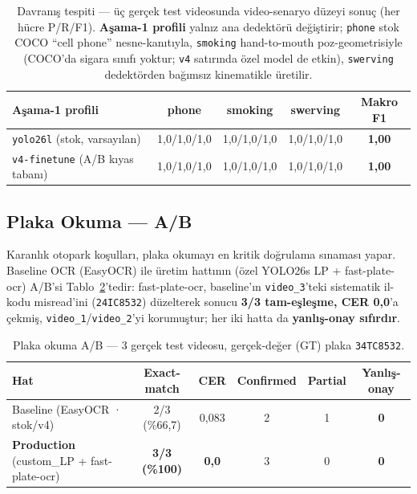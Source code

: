 \documentclass[12pt,a4paper]{article}
\newcommand{\tcode}[1]{\texttt{\small #1}}
\begin{document}
\begin{table}[H]\centering\small
\caption{Davranış tespiti — üç gerçek test videosunda video-senaryo düzeyi sonuç (her hücre P/R/F1). \textbf{Aşama-1 profili} yalnız ana dedektörü değiştirir; \tcode{phone} stok COCO ``cell phone'' nesne-kanıtıyla, \tcode{smoking} hand-to-mouth poz-geometrisiyle (COCO'da sigara sınıfı yoktur; \tcode{v4} satırında özel model de etkin), \tcode{swerving} dedektörden bağımsız kinematikle üretilir.}\label{tab:beh}
\begin{tabularx}{\textwidth}{>{\raggedright\arraybackslash}X cccc}
\toprule
\textbf{Aşama-1 profili} & \textbf{phone} & \textbf{smoking} & \textbf{swerving} & \textbf{Makro F1} \\ \midrule
\tcode{yolo26l} (stok, varsayılan) & 1,0/1,0/1,0 & 1,0/1,0/1,0 & 1,0/1,0/1,0 & \textbf{1,00} \\
\tcode{v4-finetune} (A/B kıyas tabanı) & 1,0/1,0/1,0 & 1,0/1,0/1,0 & 1,0/1,0/1,0 & \textbf{1,00} \\
\bottomrule
\end{tabularx}
\end{table}

\subsection{Plaka Okuma — A/B}
Karanlık otopark koşulları, plaka okumayı en kritik doğrulama sınaması yapar. Baseline OCR (EasyOCR)
ile üretim hattının (özel YOLO26s LP + fast-plate-ocr) A/B'si Tablo~\ref{tab:plate}'tedir:
fast-plate-ocr, baseline'ın \tcode{video\_3}'teki sistematik il-kodu
misread'ini (\tcode{24IC8532}) düzelterek sonucu \textbf{3/3 tam-eşleşme, CER 0,0}'a çekmiş,
\tcode{video\_1}/\tcode{video\_2}'yi korumuştur; her iki hatta da \textbf{yanlış-onay sıfırdır}.

\begin{table}[H]\centering\small
\caption{Plaka okuma A/B — 3 gerçek test videosu, gerçek-değer (GT) plaka \tcode{34TC8532}.}\label{tab:plate}
\begin{tabularx}{\textwidth}{>{\raggedright\arraybackslash}X ccccc}
\toprule
\textbf{Hat} & \textbf{Exact-match} & \textbf{CER} & \textbf{Confirmed} & \textbf{Partial} & \textbf{Yanlış-onay} \\ \midrule
Baseline (EasyOCR · stok/v4) & 2/3 (\%66,7) & 0,083 & 2 & 1 & \textbf{0} \\
\textbf{Production} (custom\_LP + fast-plate-ocr) & \textbf{3/3 (\%100)} & \textbf{0,0} & 3 & 0 & \textbf{0} \\
\bottomrule
\end{tabularx}
\end{table}
\end{document}
